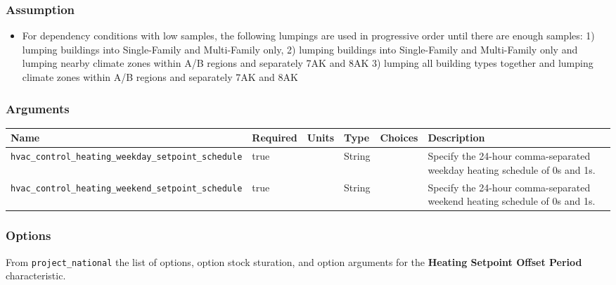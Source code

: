 \subsubsection{Assumption}\label{assumption-54}

\begin{itemize}
 
\item
  For dependency conditions with low samples, the following lumpings are
  used in progressive order until there are enough samples: 1) lumping
  buildings into Single-Family and Multi-Family only, 2) lumping
  buildings into Single-Family and Multi-Family only and lumping nearby
  climate zones within A/B regions and separately 7AK and 8AK 3) lumping
  all building types together and lumping climate zones within A/B
  regions and separately 7AK and 8AK
\end{itemize}

\subsubsection{Arguments}\label{arguments-57}

\begin{longtable}[]{@{}llllll@{}}
\toprule\noalign{}
Name & Required & Units & Type & Choices & Description \\
\midrule\noalign{}
\endhead
\bottomrule\noalign{}
\endlastfoot
\texttt{hvac\_control\_heating\_weekday\_setpoint\_schedule} & true & &
String & & Specify the 24-hour comma-separated weekday heating schedule
of 0s and 1s. \\
\texttt{hvac\_control\_heating\_weekend\_setpoint\_schedule} & true & &
String & & Specify the 24-hour comma-separated weekend heating schedule
of 0s and 1s. \\
\end{longtable}

\subsubsection{Options}\label{options-90}

From \texttt{project\_national} the list of options, option stock
sturation, and option arguments for the \textbf{Heating Setpoint Offset
Period} characteristic.

